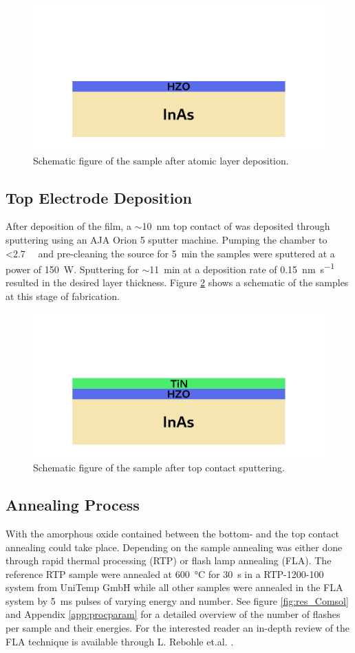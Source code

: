 \documentclass[11pt,twoside]{eitExjobb}
\begin{document}
\begin{figure}[htbp]
    \centering
    \includegraphics[width=.45\linewidth]{fig/fabproc/fab_2.png}
    \caption{Schematic figure of the sample after atomic layer
    deposition.}\label{fig:fab_2}
\end{figure}

\subsection{Top Electrode Deposition}
After deposition of the  film, a $\sim$\SI{10}{\nano\meter} top
contact of  was deposited through sputtering using an AJA Orion 5
sputter machine. Pumping the chamber to <\SI{2.7}{\milli\torr} and pre-cleaning
the source for \SI{5}{\minute} the samples were sputtered at a power of
\SI{150}{\watt}. Sputtering for $\sim$\SI{11}{\minute} at a deposition rate of
\SI{0.15}{\nano\meter\per\second} resulted in the desired layer thickness.
Figure \ref{fig:fab_3} shows a schematic of the samples at this stage of
fabrication.

\begin{figure}[htbp]
    \centering
    \includegraphics[width=.45\linewidth]{fig/fabproc/fab_3.png}
    \caption{Schematic figure of the sample after top contact
    sputtering.}\label{fig:fab_3}
\end{figure}

\subsection{Annealing Process}
With the amorphous oxide contained between the bottom- and the top contact annealing
could take place. Depending on the sample annealing was either done through
rapid thermal processing (RTP) or flash lamp annealing (FLA). The reference RTP
sample were annealed at \SI{600}{\celsius} for \SI{30}{\second} in a
RTP-1200-100 system from UniTemp GmbH while all other samples were annealed in
the FLA system by \SI{5}{\milli\second} pulses of varying energy and number.
See figure \ref{fig:res_Comsol} and Appendix \ref{app:procparam} for a detailed
overview of the number of flashes per sample and their energies. For the
interested reader an in-depth review of the FLA technique is available through
L. Rebohle et.al. \cite{rebohle2016review}.
\end{document}
